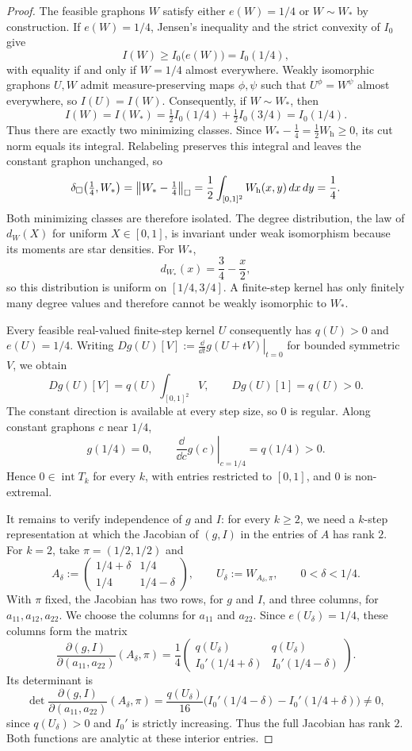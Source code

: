 \begin{proof}
The feasible graphons $W$ satisfy either $e(W)=1/4$ or $W\sim W_*$ by construction.
If $e(W)=1/4$, Jensen's inequality and the strict convexity of $I_0$ give
\[
  I(W)\ge I_0\bigl(e(W)\bigr)=I_0(1/4),
\]
with equality if and only if $W=1/4$ almost everywhere.
Weakly isomorphic graphons $U,W$ admit measure-preserving maps $\phi,\psi$
such that $U^\phi=W^\psi$ almost everywhere, so $I(U)=I(W)$.
Consequently, if $W\sim W_*$, then
\[
  I(W)=I(W_*)=\tfrac12 I_0(1/4)+\tfrac12 I_0(3/4)=I_0(1/4).
\]
Thus there are exactly two minimizing classes.
Since $W_*-\tfrac14=\tfrac12W_{\mathrm h}\ge0$, its cut norm equals its
integral. Relabeling preserves this integral and leaves the constant
graphon unchanged, so
\[
  \delta_\square\bigl(\tfrac14,W_*\bigr)
  =\bigl\|W_*-\tfrac14\bigr\|_\square
  =\frac12\int_{[0,1]^2}W_{\mathrm h}(x,y)\,d x\,d y=\frac14.
\]
Both minimizing classes are therefore isolated.
The degree distribution, the law of $d_W(X)$ for uniform $X\in[0,1]$,
is invariant under weak isomorphism because its moments are star densities.
For $W_*$,
\[
  d_{W_*}(x)=\frac34-\frac{x}{2},
\]
so this distribution is uniform on $[1/4,3/4]$.
A finite-step kernel has only finitely many degree values and
therefore cannot be weakly isomorphic to $W_*$.

Every feasible real-valued finite-step kernel $U$ consequently has
$q(U)>0$ and $e(U)=1/4$.  Writing
$Dg(U)[V]:=\left.\frac{\dd}{\dd t}g(U+tV)\right|_{t=0}$ for bounded
symmetric $V$, we obtain
\[
  Dg(U)[V]=q(U)\int_{[0,1]^2}V,
  \qquad Dg(U)[1]=q(U)>0.
\]
The constant direction is available at every step size, so $0$ is
regular.  Along constant graphons $c$ near $1/4$,
\[
  g(1/4)=0,\qquad
  \left.\frac{\dd}{\dd c}g(c)\right|_{c=1/4}=q(1/4)>0.
\]
Hence $0\in\operatorname{int}T_k$ for every $k$, with entries
restricted to $[0,1]$, and $0$ is non-extremal.

It remains to verify independence of $g$ and $I$: for every $k\ge2$,
we need a $k$-step representation at which the Jacobian of $(g,I)$ in
the entries of $A$ has rank $2$.  For $k=2$, take $\pi=(1/2,1/2)$ and
\[
  A_\delta:=\begin{pmatrix}1/4+\delta&1/4\\1/4&1/4-\delta\end{pmatrix},
  \qquad U_\delta:=W_{A_\delta,\pi},\qquad 0<\delta<1/4.
\]
With $\pi$ fixed, the Jacobian has two rows, for $g$ and $I$, and three
columns, for $a_{11},a_{12},a_{22}$.  We choose the columns
for $a_{11}$ and $a_{22}$.
Since $e(U_\delta)=1/4$, these columns form the matrix
\[
  \frac{\partial(g,I)}{\partial(a_{11},a_{22})}(A_\delta,\pi)
  =\frac14
  \begin{pmatrix}
    q(U_\delta)&q(U_\delta)\\
    I_0'(1/4+\delta)&I_0'(1/4-\delta)
  \end{pmatrix}.
\]
Its determinant is
\[
  \det\frac{\partial(g,I)}{\partial(a_{11},a_{22})}(A_\delta,\pi)
  =\frac{q(U_\delta)}{16}
     \bigl(I_0'(1/4-\delta)-I_0'(1/4+\delta)\bigr)\ne0,
\]
since $q(U_\delta)>0$ and $I_0'$ is strictly increasing.
Thus the full Jacobian has rank $2$.
Both functions are analytic at these interior entries.


\end{proof}
